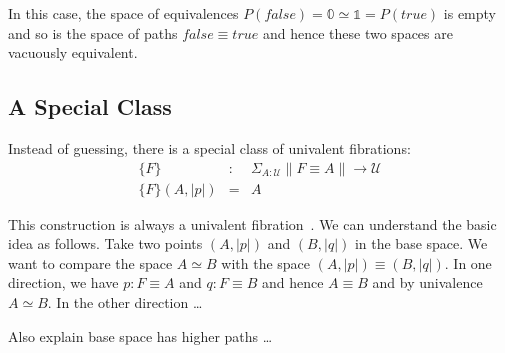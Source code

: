 \documentclass{entcs}
\newcommand{\fc}{\mathit{false}}
\newcommand{\tc}{\mathit{true}}
\begin{document}
\medskip\noindent In this case, the space of equivalences
$P(\fc) = \mathbb{0} \simeq \mathbb{1} = P(\tc)$ is empty and so is the space of
paths $\fc \equiv \tc$ and hence these two spaces are vacuously equivalent.

\subsection{A Special Class}

Instead of guessing, there is a special class of univalent fibrations:
\[\begin{array}{rcl}
\{F\} &:& \Sigma_{A:\mathcal{U}} \| F \equiv A \| \rightarrow \mathcal{U} \\
\{F\}(A,|p|) &=& A
\end{array}\]

This construction is always a univalent fibration~\cite{XXX}. We can understand
the basic idea as follows. Take two points $(A,|p|)$ and $(B,|q|)$ in the base
space. We want to compare the space $A \simeq B$ with the space
$(A,|p|) \equiv (B,|q|)$.  In one direction, we have $p : F \equiv A$ and
$q : F \equiv B$ and hence $A \equiv B$ and by univalence $A \simeq B$. In the
other direction \ldots

Also explain base space has higher paths \ldots
\end{document}

